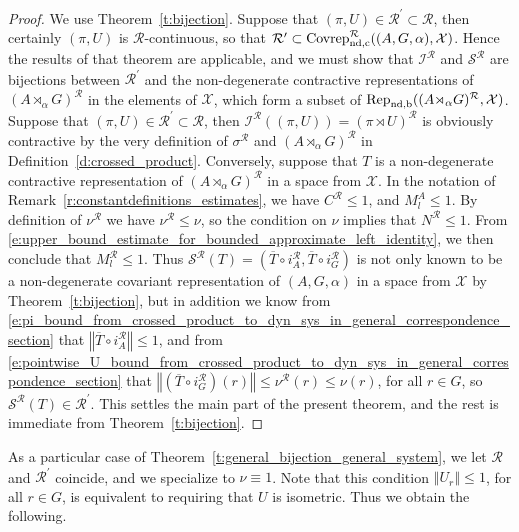 \documentclass{amsart}
\theoremstyle{plain}
\theoremstyle{definition}
\numberwithin{equation}{section}
\begin{document}
\begin{proof}
We use Theorem~\ref{t:bijection}. Suppose that ${(\pi,U)} \in {\mathcal R}^\prime\subset{\mathcal R}$, then certainly ${(\pi,U)}$ is ${\mathcal R}$-continuous, so that ${\mathcal R}^\prime\subset {\ensuremath{{\textup{Covrep}}_{\textup{nd,c}}^{\mathcal R}}}({(A,G,\alpha)},{\mathcal X})$. Hence the results of that theorem are applicable, and we must show that ${{\mathcal I}^{\mathcal R}}$ and ${{\mathcal S}^{\mathcal R}}$ are bijections between ${\mathcal R}^\prime$ and the non-degenerate contractive representations of ${(A {\rtimes}_\alpha G)^\mathcal{R}}$ in the elements of ${\mathcal X}$, which form a subset of ${\ensuremath{\textup{Rep}_{\textup{nd,b}}}}({(A {\rtimes}_\alpha G)^\mathcal{R}},{\mathcal X})$. Suppose that ${(\pi,U)} \in {\mathcal R}^\prime\subset{\mathcal R}$, then ${{\mathcal I}^{\mathcal R}}({(\pi,U)})={(\pi \rtimes U)^\mathcal R}$ is obviously contractive by the very definition of ${\sigma^{\mathcal R}}$ and ${(A {\rtimes}_\alpha G)^\mathcal{R}}$ in Definition~\ref{d:crossed_product}. Conversely, suppose that $T$ is a non-degenerate contractive representation of ${(A {\rtimes}_\alpha G)^\mathcal{R}}$ in a space from ${\mathcal X}$. In the notation of Remark~\ref{r:constantdefinitions_estimates}, we have ${{C^{\mathcal R}}}\leq 1$, and $M_l^A\leq 1$. By definition of ${\nu^{\mathcal R}}$ we have ${\nu^{\mathcal R}} \leq \nu$, so the condition on $\nu$ implies that ${N^{\mathcal R}}\leq 1$. From \eqref{e:upper_bound_estimate_for_bounded_approximate_left_identity}, we then conclude that $M_l^{\mathcal R}\leq 1$. Thus ${{\mathcal S}^{\mathcal R}}(T)=(\overline{T} \circ i_A^{\mathcal R}, \overline{T} \circ i_G^{\mathcal R})$ is not only known to be a non-degenerate covariant representation of ${(A,G,\alpha)}$ in a space from ${\mathcal X}$ by Theorem~\ref{t:bijection}, but in addition we know from \eqref{e:pi_bound_from_crossed_product_to_dyn_sys_in_general_correspondence_section} that ${\left\Vert {\overline{T} \circ i_A^{\mathcal R}} \right\Vert} \leq 1$, and from \eqref{e:pointwise_U_bound_from_crossed_product_to_dyn_sys_in_general_correspondence_section} that ${\left\Vert {(\overline{T} \circ i_G^{\mathcal R})(r)} \right\Vert} \leq {\nu^{\mathcal R}}(r) \leq \nu(r)$, for all $r\in G$, so ${{\mathcal S}^{\mathcal R}}(T) \in {\mathcal R}^\prime$. This settles the main part of the present theorem, and the rest is immediate from Theorem~\ref{t:bijection}.
\end{proof}

As a particular case of Theorem~\ref{t:general_bijection_general_system}, we let ${\mathcal R}$ and ${\mathcal R}^\prime$ coincide, and we specialize to $\nu \equiv 1$. Note that this condition ${\left\Vert {U_r} \right\Vert} \leq 1$, for all $r \in G$, is equivalent to requiring that $U$ is isometric. Thus we obtain the following.
\end{document}
